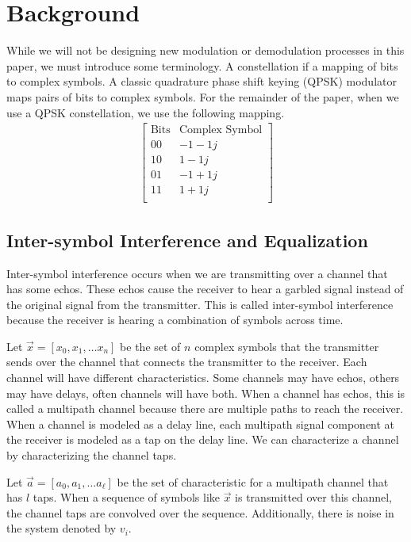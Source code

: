\section{Background}

While we will not be designing new modulation or demodulation processes in this paper, we must introduce some terminology.
A constellation if a mapping of bits to complex symbols.  
A classic quadrature phase shift keying (QPSK) modulator maps pairs of bits to complex symbols.
For the remainder of the paper, when we use a QPSK constellation, we use the following mapping.
\begin{align*}
\begin{bmatrix}
\text{Bits} & \text{Complex Symbol} \\
\hline
00 & -1-1j \\
10 & 1 -1j \\
01 & -1 + 1j \\
11 & 1+1j \\
\end{bmatrix}
\end{align*}

\subsection{Inter-symbol Interference and Equalization}

Inter-symbol interference occurs when we are transmitting over a channel that has some echos.  These echos cause the receiver to hear a garbled signal instead of the original signal from the transmitter.  This is called inter-symbol interference because the receiver is hearing a combination of symbols across time. 

Let $\vec{x}=[x_0, x_1, \ldots x_n]$ be the set of $n$ complex symbols that the transmitter sends over the channel that connects the transmitter to the receiver.
Each channel will have different characteristics. Some channels may have echos, others may have delays, often channels will have both.  When a channel has echos, this is called a multipath channel because there are multiple paths to reach the receiver.  
When a channel is modeled as a delay line, each multipath signal component at the receiver is modeled as a tap on the delay line.  
We can characterize a channel by characterizing the channel taps.

Let $\vec{a} = [a_0, a_1, \ldots a_{\ell}]$ be the set of characteristic for a multipath channel that has $l$ taps. When a sequence of symbols like $\vec{x}$ is transmitted over this channel, the channel taps are convolved over the sequence.  Additionally, there is noise in the system denoted by $v_i$. 

